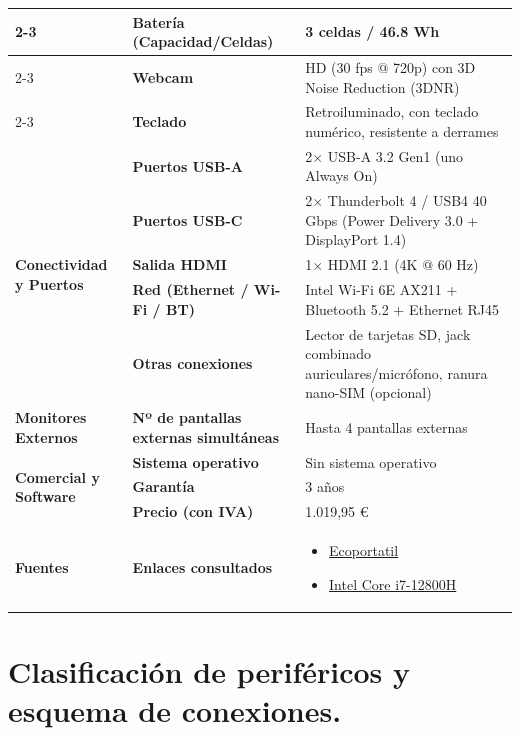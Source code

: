 \documentclass[11.5pt]{article}
\begin{document}
\begin{table}[H]
\begin{tabularx}{\textwidth}{|l|l|X|}
			\cline{2-3}
			& \textbf{Batería (Capacidad/Celdas)} & 3 celdas / 46.8 Wh \\
			\cline{2-3}
			& \textbf{Webcam} & HD (30 fps @ 720p) con 3D Noise Reduction (3DNR) \\
			\cline{2-3}
			& \textbf{Teclado} & Retroiluminado, con teclado numérico, resistente a derrames \\
			\hline
			\multirow{5}{*}{\textbf{Conectividad y Puertos}} 
			& \textbf{Puertos USB-A} & 2\(\times\) USB-A 3.2 Gen1 (uno Always On) \\
			\cline{2-3}
			& \textbf{Puertos USB-C} & 2\(\times\) Thunderbolt 4 / USB4 40 Gbps (Power Delivery 3.0 + DisplayPort 1.4) \\
			\cline{2-3}
			& \textbf{Salida HDMI} & 1\(\times\) HDMI 2.1 (4K @ 60 Hz) \\
			\cline{2-3}
			& \textbf{Red (Ethernet / Wi-Fi / BT)} & Intel Wi-Fi 6E AX211 + Bluetooth 5.2 + Ethernet RJ45 \\
			\cline{2-3}
			& \textbf{Otras conexiones} & Lector de tarjetas SD, jack combinado auriculares/micrófono, ranura nano-SIM (opcional) \\
			\hline
			\textbf{Monitores Externos} & \textbf{Nº de pantallas externas simultáneas} & Hasta 4 pantallas externas \\
			\hline
			\multirow{3}{*}{\textbf{Comercial y Software}} 
			& \textbf{Sistema operativo} & Sin sistema operativo \\
			\cline{2-3}
			& \textbf{Garantía} & 3 años \\
			\cline{2-3}
			& \textbf{Precio (con IVA)} & 1.019,95 € \\
			\hline
			\textbf{Fuentes} & \textbf{Enlaces consultados} & 
			\begin{itemize}[leftmargin=*,nosep]
				\item \href{https://ecoportatil.es/producto/lenovo-thinkpad-p15v-g3-156-i7-12800h-32gb-ssd-1tb-fhd-nvidia-quadro-t1200-4gb-a-copia}{Ecoportatil}
				\item \href{https://www.intel.la/content/www/xl/es/products/sku/226059/intel-core-i712800h-processor-24m-cache-up-to-4-80-ghz/specifications.html}{Intel Core i7-12800H}
			\end{itemize} \\
			\hline
		\end{tabularx}
	\end{table}
	
	\section{Clasificación de periféricos y esquema de conexiones.}
	
\end{document}
